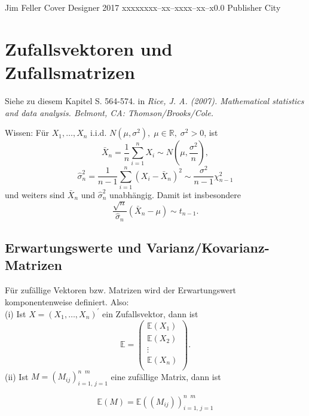 \documentclass{tstextbook}
\begin{document}
       {Jim Feller}
       {Cover Designer}
       {2017}
       {xxxxx}{xxx--xx--xxxx--xx--x}{0.0}
       {Publisher}
       {City}



\chapter{Zufallsvektoren und Zufallsmatrizen}

\begin{book}
	Siehe zu diesem Kapitel S. 564-574. in \textit{Rice, J. A. (2007). Mathematical statistics and data analysis. Belmont, CA: Thomson/Brooks/Cole.} 
\end{book}




\begin{remark}
	Wissen: Für $ X_1, \ldots ,X_n $ i.i.d. $ N(\mu,\sigma^{2}), \; \mu\in\mathbb{R}, \; \sigma^2 > 0 $, ist 
	\[ \bar{X}_n = \frac{1}{n} \sum_{i=1}^{n} X_i \sim N\left(\mu, \frac{\sigma^2}{n} \right),
	\] 
	\[ \hat{\sigma}_n^2 = \frac{1}{n-1} \sum_{i=1}^{n} ( X_i - \bar{X}_n)^2 \sim \frac{\sigma^2}{n-1} \chi_{n-1}^2 
	\]  
	und weiters sind $ \bar{X}_n $  und $ \hat{\sigma}^2_n $ unabhängig. Damit ist insbesondere 
	\[ \frac{\sqrt{n}}{\hat{\sigma}_n}(\bar{X}_n-\mu) \sim t_{n-1}.
	\]
	
\end{remark}
 
 
 


\section{Erwartungswerte und Varianz/Kovarianz-Matrizen}


\begin{definition}[Erwartungswert]
	Für zufällige Vektoren bzw. Matrizen wird der Erwartungswert komponentenweise definiert. Also: \\
	(i) Ist $ X= \left(X_1, \ldots ,X_n\right)^\prime $  ein Zufallsvektor, dann ist 
\[ \mathbb{E} = \begin{pmatrix} \mathbb{E}(X_1)\\
		\mathbb{E}(X_2)\\
		\vdots\\
		\mathbb{E}(X_n)\\
	\end{pmatrix}.
\]
	(ii) Ist $ M=(M_{ij})_{i=1,\, j=1}^{n \;\; m} $ eine zufällige Matrix, dann ist 
	
\[ 
\mathbb{E}(M)= \mathbb{E} \left((M_{ij})\right)_{i=1,\, j=1}^{n \;\; m}	
\]
\end{definition}
\end{document}
